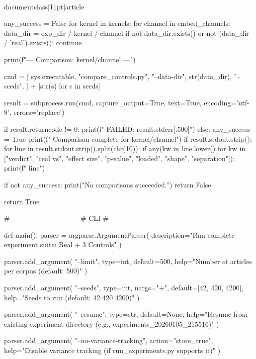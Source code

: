 \\documentclass[11pt]{article}
\begin{document}
\begin{CodeBlock}
    any_success = False
    for kernel in kernels:
        for channel in embed_channels:
            data_dir = exp_dir / kernel / channel
            if not data_dir.exists() or not (data_dir / 'real').exists():
                continue

            print(f"\n--- Comparison: {kernel}/{channel} ---")

            cmd = [
                sys.executable,
                "compare_controls.py",
                "--data-dir", str(data_dir),
                "--seeds",
            ] + [str(s) for s in seeds]

            result = subprocess.run(cmd, capture_output=True, text=True, encoding='utf-8', errors='replace')

            if result.returncode != 0:
                print(f"  FAILED: {result.stderr[:500]}")
            else:
                any_success = True
                print(f"  Comparison complete for {kernel}/{channel}")
                if result.stdout.strip():
                    for line in result.stdout.strip().split(chr(10)):
                        if any(kw in line.lower() for kw in ["verdict", "real vs", "effect size", "p-value", "loaded", "shape", "separation"]):
                            print(f"  {line}")

    if not any_success:
        print("No comparisons succeeded.")
        return False

    return True


# -----------------------------
# CLI
# -----------------------------

def main():
    parser = argparse.ArgumentParser(
        description="Run complete experiment suite: Real + 3 Controls"
    )

    parser.add_argument(
        "--limit",
        type=int,
        default=500,
        help="Number of articles per corpus (default: 500)"
    )

    parser.add_argument(
        "--seeds",
        type=int,
        nargs="+",
        default=[42, 420, 4200],
        help="Seeds to run (default: 42 420 4200)"
    )
    
    parser.add_argument(
        "--resume",
        type=str,
        default=None,
        help="Resume from existing experiment directory (e.g., experiments_20260105_215516)"
    )

    parser.add_argument(
        "--no-variance-tracking",
        action="store_true",
        help="Disable variance tracking (if run_experiments.py supports it)"
    )
    

\end{CodeBlock}
\end{document}
